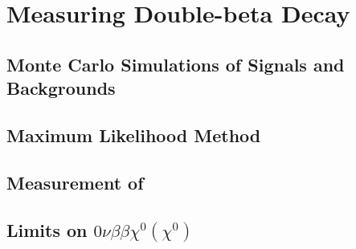 \documentclass[herrin-thesis.tex]{subfiles}
\begin{document}
\chapter{Measuring Double-beta Decay}
\label{ch:analysis}

\section{Monte Carlo Simulations of Signals and Backgrounds}

\section{Maximum Likelihood Method}

\section{Measurement of \twonu}

\section{Limits on \(0\nu\beta\beta\chi^0(\chi^0)\)}
\end{document}

